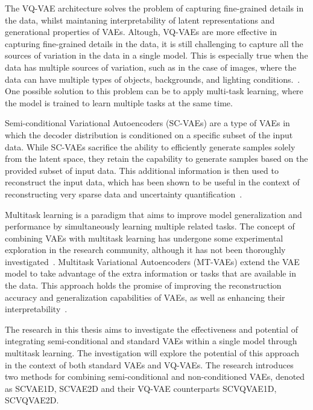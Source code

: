 The VQ-VAE architecture solves the problem of capturing fine-grained details in the data, whilst maintaning interpretability of latent representations and generational properties of VAEs. 
Altough, VQ-VAEs are more effective in capturing fine-grained details in the data, it is still challenging to capture all the sources of variation in the data in a single model. This is especially true when the data has multiple sources of variation, such as in the case of images, where the data can have multiple types of objects, backgrounds, and lighting conditions.~\cite{Kingma_2019,vqvae, vqvae2}. One possible solution to this problem can be to apply multi-task learning, where the model is trained to learn multiple tasks at the same time.


Semi-conditional Variational Autoencoders (SC-VAEs) are a type of VAEs in which the decoder distribution is conditioned on a specific subset of the input data. While SC-VAEs sacrifice the ability to efficiently generate samples solely from the latent space, they retain the capability to generate samples based on the provided subset of input data. This additional information is then used to reconstruct the input data, which has been shown to be useful in the context of reconstructing very sparse data and uncertainty quantification~\cite{Gundersen_2021}.

Multitask learning is a paradigm that aims to improve model generalization and performance by simultaneously learning multiple related tasks. The concept of combining VAEs with multitask learning has undergone some experimental exploration in the research community, although it has not been thoroughly investigated~\cite{multitaskvib}. Multitask Variational Autoencoders (MT-VAEs) extend the VAE model to take advantage of the extra information or tasks that are available in the data. This approach holds the promise of improving the reconstruction accuracy and generalization capabilities of VAEs, as well as enhancing their interpretability~\cite{multitasklearning}.

The research in this thesis aims to investigate the effectiveness and potential of integrating semi-conditional and standard VAEs within a single model through multitask learning. The investigation will explore the potential of this approach in the context of both standard VAEs and VQ-VAEs. The research introduces two methods for combining semi-conditional and non-conditioned VAEs, denoted as SCVAE1D, SCVAE2D and their VQ-VAE counterparts SCVQVAE1D, SCVQVAE2D.

